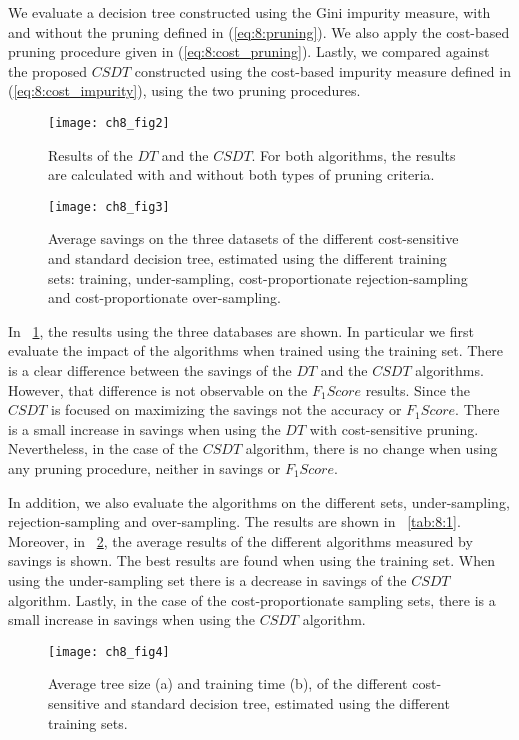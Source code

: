 We evaluate a decision tree constructed using the Gini impurity measure, with and without the 
pruning defined in (\ref{eq:8:pruning}). We also apply    the cost-based pruning procedure given 
in (\ref{eq:8:cost_pruning}). Lastly, we compared against     the proposed $CSDT$ constructed 
using the cost-based impurity measure defined in (\ref{eq:8:cost_impurity}), using the two 
pruning procedures.

\begin{figure}[t]
  \centering
  \texttt{[image: ch8\_fig2]}
  \caption{Results of the $DT$ and the $CSDT$. For both algorithms, the results are 
  calculated with and without both types of pruning  criteria.}
\label{fig:8:2}
\end{figure}
\begin{figure}[t]
  \centering
  \texttt{[image: ch8\_fig3]}
  \caption{Average savings on the three datasets of the different cost-sensitive and standard 
  decision tree,  estimated using the different training sets: training, under-sampling, 
  cost-proportionate rejection-sampling  and cost-proportionate over-sampling.}
  \label{fig:8:3}
\end{figure}

In \figurename{~\ref{fig:8:2}}, the results using the three databases are shown. In particular we 
first evaluate the impact of the algorithms when trained using the training set. There is a clear 
difference between the savings of the $DT$ and the $CSDT$ algorithms. However, that difference 
is not observable on the $F_1Score$ results. Since the $CSDT$ is focused on maximizing the 
savings not the accuracy or $F_1Score$. There is a small increase in savings when using the 
$DT$ with cost-sensitive pruning. Nevertheless, in the case of the $CSDT$ algorithm, there is 
no change when using any pruning procedure, neither in savings or $F_1Score$.

In addition, we also evaluate the algorithms on the different sets, under-sampling, 
rejection-sampling and over-sampling. The results are shown in \tablename{~\ref{tab:8:1}}. 
Moreover, in \figurename{~\ref{fig:8:3}}, the average results of the different algorithms measured 
by savings is shown. The best results are found when using the training set. When using the 
under-sampling set there is a decrease in savings of the $CSDT$ algorithm. Lastly, in the case of 
the cost-proportionate sampling sets, there is a small increase in savings when using the $CSDT$ 
algorithm. 
 
\begin{figure}
  \centering
  \texttt{[image: ch8\_fig4]}
  \caption{Average tree size (a) and training time (b), of the different cost-sensitive and 
  standard decision tree, estimated using the different training sets.}
  \label{fig:8:4}
\end{figure}

